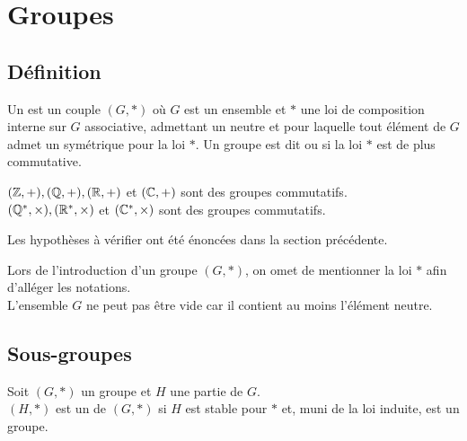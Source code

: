 \documentclass{book}
\begin{document}
\section{Groupes}
\subsection{Définition}
\begin{Definition}[Groupe]
Un  est un couple $(G,\ast)$ où $G$ est un ensemble et $\ast$ une loi de composition interne sur $G$ associative, admettant un neutre et pour laquelle tout élément de $G$ admet un symétrique pour la loi $\ast$.
Un groupe est dit  ou  si la loi $\ast$ est de plus commutative.
\end{Definition}
\begin{Proposition}
$(\mathbb{Z}, +), (\mathbb{Q}, +), (\mathbb{R}, +)$ et  $(\mathbb{C}, +)$  sont des groupes commutatifs.\\
$(\mathbb{Q}^*, \times), (\mathbb{R}^*, \times)$ et  $(\mathbb{C}^*,\times)$  sont des groupes commutatifs.\\ 
\end{Proposition}
\begin{Demonstration}
Les hypothèses à vérifier ont été énoncées dans la section précédente.
\end{Demonstration}
\begin{Remarque}
Lors de l'introduction d'un groupe $(G,*)$, on omet de mentionner la loi $*$ afin d'alléger les notations.\\
L'ensemble $G$ ne peut pas être vide car il contient au moins l'élément neutre.
\end{Remarque}
\subsection{Sous-groupes}
\begin{Definition}
Soit $(G, *)$ un groupe et $H$ une partie de $G$.\\
$(H, *)$ est un  de $(G, *)$  si $H$ est stable pour $*$ et, muni de la loi induite, est un groupe.\\
\end{Definition}
\end{document}
